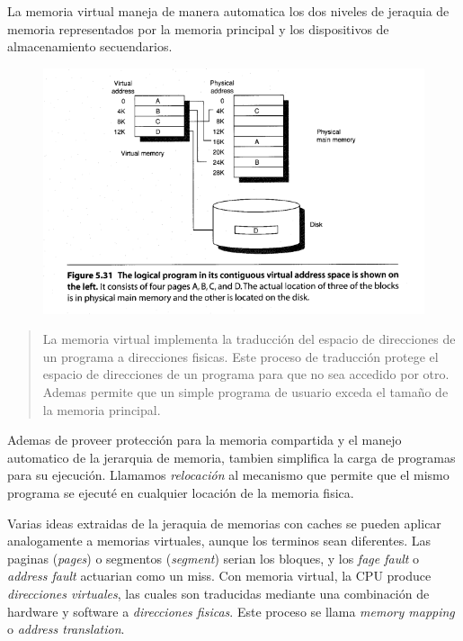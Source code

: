 \documentclass{article}
\begin{document}
La memoria virtual maneja de manera automatica los dos niveles de jeraquia de memoria representados por la memoria principal y los dispositivos de almacenamiento secuendarios.

\begin{figure}[h!]
    \includegraphics[width=\linewidth]{imagenes/VirtualAdress.png}
\end{figure}

\begin{quote}
    La memoria virtual implementa la traducción del espacio de direcciones de un programa a direcciones fisicas. Este proceso de traducción protege el espacio de direcciones de un programa para que no sea accedido por otro.
    Ademas permite que un simple programa de usuario exceda el tamaño de la memoria principal.
\end{quote}

Ademas de proveer protección para la memoria compartida y el manejo automatico de la jerarquia de memoria, tambien simplifica la carga de programas para su ejecución.
Llamamos \textit{relocación} al mecanismo que permite que el mismo programa se ejecuté en cualquier locación de la memoria fisica.

Varias ideas extraidas de la jeraquia de memorias con caches se pueden aplicar analogamente a memorias virtuales, aunque los terminos sean diferentes.
Las paginas (\textit{pages}) o segmentos (\textit{segment}) serian los bloques, y los \textit{fage fault} o \textit{address fault} actuarian como un miss. 
Con memoria virtual, la CPU produce \textit{direcciones virtuales}, las cuales son traducidas mediante una combinación de hardware y software a \textit{direcciones fisicas}. Este proceso se llama \textit{memory mapping} o \textit{address translation}.
\end{document}
